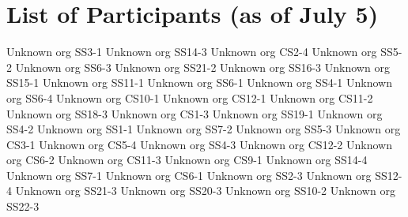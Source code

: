 \chapter{List of Participants (as of July 5)}

\setlength{\columnsep}{1cm}

\begin{multicols}{2}

\small\raggedright

{Unknown org}
{SS3-1}
{}
{Unknown org}
{SS14-3}
{}
{Unknown org}
{CS2-4}
{}
{Unknown org}
{SS5-2}
{}
{Unknown org}
{SS6-3}
{}
{Unknown org}
{SS21-2}
{}
{Unknown org}
{SS16-3}
{}
{Unknown org}
{SS15-1}
{}
{Unknown org}
{SS11-1}
{}
{Unknown org}
{SS6-1}
{}
{Unknown org}
{SS4-1}
{}
{Unknown org}
{SS6-4}
{}
{Unknown org}
{CS10-1}
{}
{Unknown org}
{CS12-1}
{}
{Unknown org}
{CS11-2}
{}
{Unknown org}
{SS18-3}
{}
{Unknown org}
{CS1-3}
{}
{Unknown org}
{SS19-1}
{}
{Unknown org}
{SS4-2}
{}
{Unknown org}
{SS1-1}
{}
{Unknown org}
{SS7-2}
{}
{Unknown org}
{SS5-3}
{}
{Unknown org}
{CS3-1}
{}
{Unknown org}
{CS5-4}
{}
{Unknown org}
{SS4-3}
{}
{Unknown org}
{CS12-2}
{}
{Unknown org}
{CS6-2}
{}
{Unknown org}
{CS11-3}
{}
{Unknown org}
{CS9-1}
{}
{Unknown org}
{SS14-4}
{}
{Unknown org}
{SS7-1}
{}
{Unknown org}
{CS6-1}
{}
{Unknown org}
{SS2-3}
{}
{Unknown org}
{SS12-4}
{}
{Unknown org}
{SS21-3}
{}
{Unknown org}
{SS20-3}
{}
{Unknown org}
{SS10-2}
{}
{Unknown org}
{SS22-3}
{}

\end{multicols}
